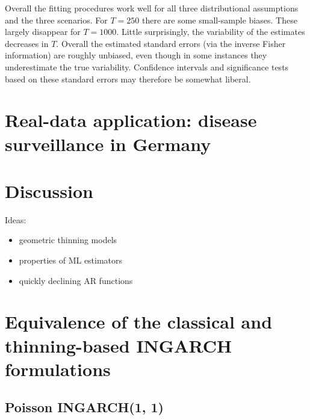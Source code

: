\documentclass{article}
\begin{document}
Overall the fitting procedures work well for all three distributional assumptions and the three scenarios. For $T = 250$ there are some small-sample biases. These largely disappear for $T = 1000$. Little surprisingly, the variability of the estimates decreases in $T$. Overall the estimated standard errors (via the inverse Fisher information) are roughly unbiased, even though in some instances they underestimate the true variability. Confidence intervals and significance tests based on these standard errors may therefore be somewhat liberal. %


\section{Real-data application: disease surveillance in Germany}
\label{sec:real_data}

\section{Discussion}
\label{sec:discussion}

Ideas:
\begin{itemize}
\item geometric thinning models
\item properties of ML estimators
\item quickly declining AR functions
\end{itemize}



\appendix
\section{Equivalence of the classical and thinning-based INGARCH formulations}
\label{appendix:proof}

\subsection{Poisson INGARCH(1, 1)}
\label{subsec:derivation_poisson11}
\end{document}
